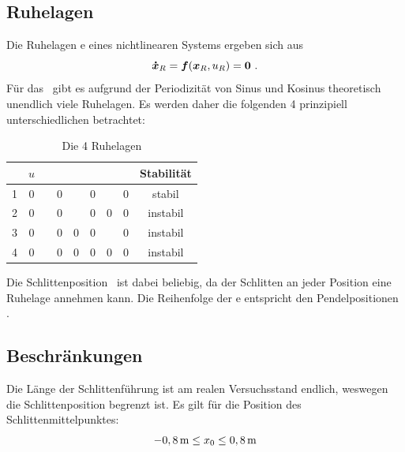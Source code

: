 \subsection{Ruhelagen}\label{sec:aps}

Die Ruhelagen \bzw \ap e eines nichtlinearen Systems ergeben sich aus
	\[
	\vexp_R = \ve{f}(\vex_R,u_R) = \ve{0}  \ .
\]
Für das \spds\ gibt es aufgrund der Periodizität von Sinus und Kosinus theoretisch unendlich viele Ruhelagen. 
Es werden daher die folgenden 4 prinzipiell unterschiedlichen betrachtet:
\begin{table}[h]
	\centering
	\caption{Die 4 Ruhelagen}
		\begin{tabular}{ccccccccc}
		\toprule
			\ap  & $u$ & \xo & \xop & \phe & \phep & \phz & \phzp & Stabilität  \\
			\midrule
			1	&	0 &	\xor	&	0	&	\pii	&	0	&	\pii	&	0	& stabil  \\
			2	&	0 &	\xor	&	0	&	\pii	&	0	&	0			&	0	& instabil  \\
			3	&	0 &	\xor	&	0	&	0			&	0	&	\pii	&	0	& instabil  \\
			4	&	0 &	\xor	&	0	&	0			&	0	&	0			&	0	& instabil  \\
			\bottomrule
		\end{tabular}
	\label{tab:aps}
\end{table}

Die Schlittenposition \xo\ ist dabei beliebig, da der Schlitten an jeder Position eine Ruhelage annehmen kann.
Die Reihenfolge der \ap e entspricht den Pendelpositionen .


\subsection{Beschränkungen}

Die Länge der Schlittenführung ist am realen Versuchsstand endlich, weswegen die Schlittenposition begrenzt ist.
Es gilt für die Position des Schlittenmittelpunktes:
	\[ 
	 -0,8\,\mathrm{m} \leq x_0 \leq 0,8\,\mathrm{m}
\]
